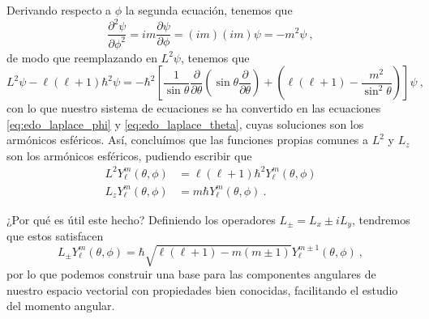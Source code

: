 \begin{ejemplo}
    Derivando respecto a $\phi$ la segunda ecuación, tenemos que
    \begin{equation*}
        \frac{\partial^2 \psi}{\partial \phi^2} = i m \frac{\partial \psi}{\partial \phi} = (im) (im) \psi = -m^2 \psi \ ,
    \end{equation*}
    de modo que reemplazando en $L^2 \psi$, tenemos que
    \begin{equation*}
        L^2 \psi - \ell(\ell+1) \hbar^2 \psi = -\hbar^2 \left[ \frac{1}{\sin \theta} \frac{\partial}{\partial \theta}\left( \sin\theta \frac{\partial}{\partial \theta}  \right) + \left( \ell(\ell+1) -  \frac{m^2}{\sin^2 \theta} \right) \right] \psi \ ,
    \end{equation*}
    con lo que nuestro sistema de ecuaciones se ha convertido en las ecuaciones \eqref{eq:edo_laplace_phi} y \eqref{eq:edo_laplace_theta}, cuyas soluciones son los armónicos esféricos. Así, concluímos que las funciones propias comunes a $L^2$ y $L_z$ son los armónicos esféricos, pudiendo escribir que
    \begin{align*}
        L^2 Y_\ell^m(\theta, \phi) & = \ell(\ell+1) \hbar^2 Y_\ell^m(\theta, \phi) \\
        L_z Y_\ell^m(\theta, \phi) & = m \hbar Y_\ell^m(\theta, \phi) \ .
    \end{align*}

    ¿Por qué es útil este hecho? Definiendo los operadores $L_\pm = L_x \pm i L_y$, tendremos que estos satisfacen 
    \begin{equation*}
        L_\pm Y_\ell^m(\theta, \phi) = \hbar \sqrt{\ell(\ell+1) - m(m \pm 1)} Y_\ell^{m \pm 1}(\theta, \phi) \ ,
    \end{equation*}
    por lo que podemos construir una base para las componentes angulares de nuestro espacio vectorial con propiedades bien conocidas, facilitando el estudio del momento angular.
\end{ejemplo}